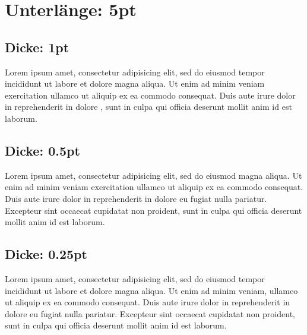 \documentclass{article}
\begin{document}
\section{Unterlänge: 5pt}

\lueckeunterlaenge{5pt}

\subsection{Dicke: 1pt}

\lueckedicke{1pt}

Lorem ipsum  amet, consectetur adipisicing elit, sed
do eiusmod tempor incididunt ut labore et dolore magna aliqua. Ut enim
ad minim veniam exercitation ullamco  ut aliquip ex
ea commodo consequat. Duis aute irure dolor in reprehenderit in
 dolore , sunt in culpa
qui officia deserunt mollit anim id est laborum.

\subsection{Dicke: 0.5pt}

\lueckedicke{0.5pt}

Lorem ipsum  amet, consectetur adipisicing elit, sed
do eiusmod  magna aliqua.
Ut enim ad minim veniam exercitation ullamco  ut
aliquip ex ea commodo consequat. Duis aute irure dolor in reprehenderit
in  dolore eu fugiat nulla pariatur.
Excepteur sint occaecat cupidatat non proident, sunt in culpa qui
officia deserunt mollit anim id est laborum.

\subsection{Dicke: 0.25pt}

\lueckedicke{0.25pt}

Lorem ipsum  amet, consectetur adipisicing elit, sed
do eiusmod tempor incididunt ut labore et dolore magna aliqua. Ut enim
ad minim veniam, ullamco  ut aliquip
ex ea commodo consequat. Duis aute irure dolor in reprehenderit in
 dolore eu fugiat nulla pariatur.
Excepteur sint occaecat cupidatat non proident, sunt in culpa qui
officia deserunt mollit anim id est laborum.
\end{document}
